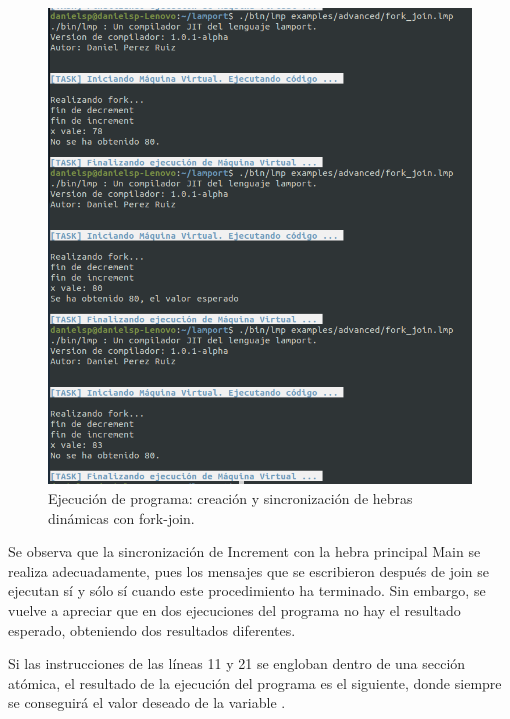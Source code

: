 \newpage

\begin{figure}[h]
    \includegraphics[width=0.88\linewidth]{images/ejemplos/concurrentes/fork_join.png}
    \caption{Ejecución de programa: creación y sincronización de hebras dinámicas con fork-join.}
    \label{fig:lamportForkJoin_exec}
\end{figure}

Se observa que la sincronización de Increment con la hebra principal Main se realiza adecuadamente, pues los mensajes que se escribieron después de join se ejecutan sí y sólo sí cuando este procedimiento ha terminado. Sin embargo, se vuelve a apreciar que en dos ejecuciones del programa no hay el resultado esperado, obteniendo dos resultados diferentes.

\newpage
Si las instrucciones de las líneas 11 y 21 se engloban dentro de una sección atómica, el resultado de la ejecución del programa es el siguiente, donde siempre se conseguirá el valor deseado de la variable .

